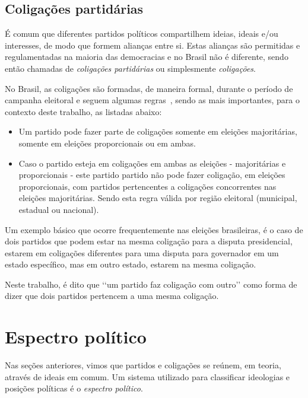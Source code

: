 
\subsection{Coligações partidárias}
\label{conceitos__coligacoes}

É comum que diferentes partidos políticos compartilhem ideias, ideais e/ou interesses, de modo que formem alianças entre si. Estas alianças são permitidas e regulamentadas na maioria das democracias e no Brasil não é diferente, sendo então chamadas de \emph{coligações partidárias} ou simplesmente \emph{coligações}.

No Brasil, as coligações são formadas, de maneira formal, durante o período de campanha eleitoral e seguem algumas regras~\cite{brasil1997lei9504}, sendo as mais importantes, para o contexto deste trabalho, as listadas abaixo:

\begin{itemize}
    \item Um partido pode fazer parte de coligações somente em eleições majoritárias, somente em eleições proporcionais ou em ambas.
    \item Caso o partido esteja em coligações em ambas as eleições - majoritárias e proporcionais - este partido partido não pode fazer coligação, em eleições proporcionais, com partidos pertencentes a coligações concorrentes nas eleições majoritárias. Sendo esta regra válida por região eleitoral (municipal, estadual ou nacional).
\end{itemize}

Um exemplo básico que ocorre frequentemente nas eleições brasileiras, é o caso de dois partidos que podem estar na mesma coligação para a disputa presidencial, estarem em coligações diferentes para uma disputa para governador em um estado específico, mas em outro estado, estarem na mesma coligação.

Neste trabalho, é dito que ‘‘um partido faz coligação com outro’’ como forma de dizer que dois partidos pertencem a uma mesma coligação.

\section{Espectro político}
\label{conceitos__espectro-politico}

Nas seções anteriores, vimos que partidos e coligações se reúnem, em teoria, através de ideais em comum. Um sistema utilizado para classificar ideologias e posições políticas é o \emph{espectro político}.

